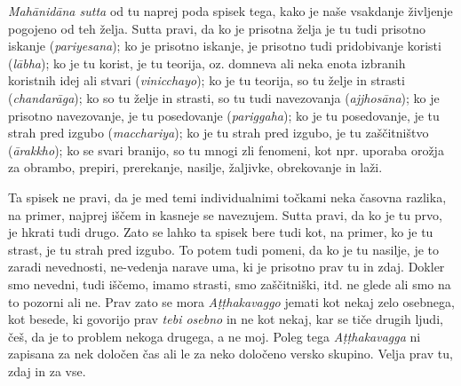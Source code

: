 \emph{Mahānidāna sutta} od tu naprej poda spisek tega, kako je naše
vsakdanje življenje pogojeno od teh želja. Sutta pravi, da ko je
prisotna želja je tu tudi prisotno iskanje (\emph{pariyesana}); ko je
prisotno iskanje, je prisotno tudi pridobivanje koristi (\emph{lābha});
ko je tu korist, je tu teorija, oz. domneva ali neka enota izbranih
koristnih idej ali stvari (\emph{vinicchayo}); ko je tu teorija, so tu
želje in strasti (\emph{chandarāga}); ko so tu želje in strasti, so tu
tudi navezovanja (\emph{ajjhosāna}); ko je prisotno navezovanje, je tu
posedovanje (\emph{pariggaha}); ko je tu posedovanje, je tu strah pred
izgubo (\emph{macchariya}); ko je tu strah pred izgubo, je tu
zaščitništvo (\emph{ārakkho}); ko se svari branijo, so tu mnogi zli
fenomeni, kot npr. uporaba orožja za obrambo, prepiri, prerekanje,
nasilje, žaljivke, obrekovanje in laži.

Ta spisek ne pravi, da je med temi individualnimi točkami neka časovna
razlika, na primer, najprej iščem in kasneje se navezujem. Sutta pravi,
da ko je tu prvo, je hkrati tudi drugo. Zato se lahko ta spisek bere
tudi kot, na primer, ko je tu strast, je tu strah pred izgubo. To potem
tudi pomeni, da ko je tu nasilje, je to zaradi nevednosti, ne-vedenja
narave uma, ki je prisotno prav tu in zdaj. Dokler smo nevedni, tudi
iščemo, imamo strasti, smo zaščitniški, itd. ne glede ali smo na to
pozorni ali ne. Prav zato se mora \emph{Aṭṭhakavaggo} jemati kot nekaj
zelo osebnega, kot besede, ki govorijo prav \emph{tebi osebno} in ne kot
nekaj, kar se tiče drugih ljudi, češ, da je to problem nekoga drugega, a
ne moj. Poleg tega \emph{Aṭṭhakavagga} ni zapisana za nek določen čas
ali le za neko določeno versko skupino. Velja prav tu, zdaj in za vse.

